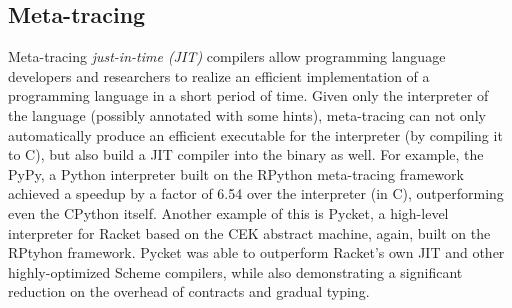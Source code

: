 \subsection{Meta-tracing}
\label{subsec:meta-trace}

Meta-tracing \textit{just-in-time (JIT)} compilers allow programming
language developers and researchers to realize an efficient
implementation of a programming language in a short period of
time. Given only the interpreter of the language (possibly annotated
with some hints), meta-tracing can not only automatically produce an
efficient executable for the interpreter (by compiling it to C), but
also build a JIT compiler into the binary as well. For example, the
PyPy, a Python interpreter built on the RPython meta-tracing framework
achieved a speedup by a factor of 6.54 over the interpreter (in C),
outperforming even the CPython itself. \cite{bolz09} Another example
of this is Pycket, a high-level interpreter for Racket based on the
CEK abstract machine, again, built on the RPtyhon framework. Pycket
was able to outperform Racket's own JIT and other highly-optimized
Scheme compilers, while also demonstrating a significant reduction on
the overhead of contracts and gradual typing. \cite{pycket15}
